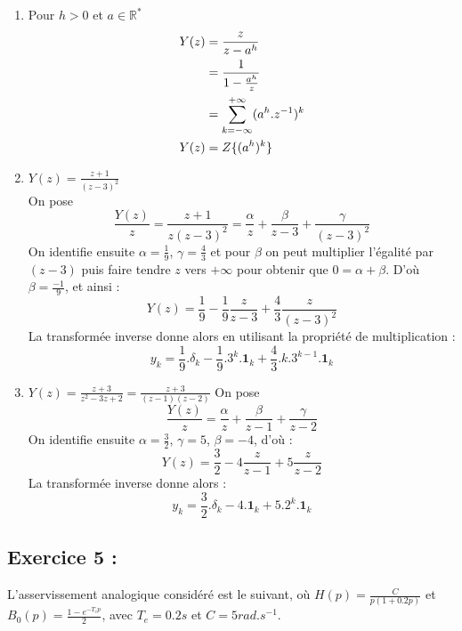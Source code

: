 \documentclass[../main.tex]{subfiles}
\begin{document}
\begin{enumerate}
\item Pour $h > 0$ et $a \in \mathbb{R^*}$
\begin{align*}
Y(z) &= \frac{z}{z-a^h}\\
&= \frac{1}{1-\frac{a^h}{z}}\\
&= \sum_{k=-\infty}^{+\infty} (a^h.z^{-1})^k\\
Y(z) & = Z\{(a^h)^k\}
\end{align*}
\bigbreak

\item $Y(z) = \frac{z+1}{(z-3)^2}$\\
On pose \[\frac{Y(z)}{z}=\frac{z+1}{z(z-3)^2}=\frac{\alpha}{z}+\frac{\beta}{z-3}+\frac{\gamma}{(z-3)^2}\]
On identifie ensuite $\alpha = \frac{1}{9}$, $\gamma =\frac{4}{3}$ et pour $\beta$ on peut multiplier l'égalité par $(z-3)$ puis faire tendre $z$ vers $+\infty$ pour obtenir que $0 = \alpha + \beta$. D'où $\beta = \frac{-1}{9}$, et ainsi :
\[Y(z) = \frac{1}{9} - \frac{1}{9}\frac{z}{z-3}+\frac{4}{3}\frac{z}{(z-3)^2}\]
La transformée inverse donne alors en utilisant la propriété de multiplication :
\[y_k = \frac{1}{9}.\delta_k - \frac{1}{9}.3^k.\mathbf{1}_k+\frac{4}{3}.k.3^{k-1}.\mathbf{1}_k\]
\bigbreak

\item $Y(z) =\frac{z+3}{z^2-3z+2}= \frac{z+3}{(z-1)(z-2)}$
On pose \[\frac{Y(z)}{z}=\frac{\alpha}{z}+\frac{\beta}{z-1}+\frac{\gamma}{z-2}\]
On identifie ensuite $\alpha = \frac{3}{2}$, $\gamma =5$, $\beta = -4$, d'où :
\[Y(z) = \frac{3}{2} - 4\frac{z}{z-1}+5\frac{z}{z-2}\]
La transformée inverse donne alors :
\[y_k = \frac{3}{2}.\delta_k - 4.\mathbf{1}_k +5.2^k.\mathbf{1}_k\]
\end{enumerate}

\subsection*{Exercice 5 :}
L'asservissement analogique considéré est le suivant, où $H(p) = \frac{C}{p(1+0.2p)}$ et $B_0(p) = \frac{1-e^{-T_ep}}{2}$, avec $T_e=0.2s$ et $C=5rad.s^{-1}$.
\begin{figure}[h!]
\centering
{}
\end{figure}
\end{document}
